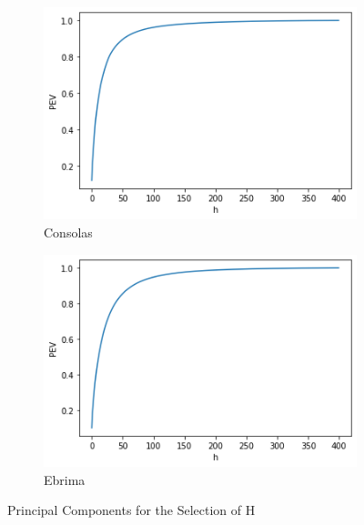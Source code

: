 \documentclass{homework}
\begin{document}
\begin{figure}[h]
\medskip
\begin{subfigure}{0.4\textwidth}
\includegraphics[width=\linewidth]{hcon.png}
\caption{Consolas} \label{fig:c}
\end{subfigure}\hspace*{\fill}
\begin{subfigure}{0.4\textwidth}
\includegraphics[width=\linewidth]{hebrim.png}
\caption{Ebrima} \label{fig:d}
\end{subfigure}
\caption{Principal Components for the Selection of H}
\label{h_pca}
\end{figure}
\end{document}
